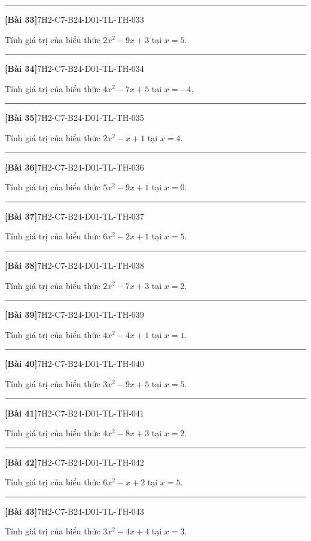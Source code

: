\documentclass[12pt,a4paper]{article}
\newif\ifloigiai
\newenvironment{cauhoi}[2]{%
  \par\medskip\noindent\rule{\textwidth}{0.4pt}\par\nopagebreak
  \noindent\textbf{[#1]}\hfill{\scriptsize\ttfamily #2}\par\nopagebreak\smallskip}{\par}
\newcommand{\loigiai}[1]{\ifloigiai\par\smallskip\noindent\textit{Lời giải.} #1\par\fi}
\begin{document}
\begin{cauhoi}{Bài 33}{7H2-C7-B24-D01-TL-TH-033}
Tính giá trị của biểu thức $2x^{2}-9x+3$ tại $x=5$.
\loigiai{Thay $x=5$: $2\cdot(5)^{2}-9\cdot(5)+3=8$.}
\end{cauhoi}
\begin{cauhoi}{Bài 34}{7H2-C7-B24-D01-TL-TH-034}
Tính giá trị của biểu thức $4x^{2}-7x+5$ tại $x=-4$.
\loigiai{Thay $x=-4$: $4\cdot(-4)^{2}-7\cdot(-4)+5=97$.}
\end{cauhoi}
\begin{cauhoi}{Bài 35}{7H2-C7-B24-D01-TL-TH-035}
Tính giá trị của biểu thức $2x^{2}-x+1$ tại $x=4$.
\loigiai{Thay $x=4$: $2\cdot(4)^{2}-1\cdot(4)+1=29$.}
\end{cauhoi}
\begin{cauhoi}{Bài 36}{7H2-C7-B24-D01-TL-TH-036}
Tính giá trị của biểu thức $5x^{2}-9x+1$ tại $x=0$.
\loigiai{Thay $x=0$: $5\cdot(0)^{2}-9\cdot(0)+1=1$.}
\end{cauhoi}
\begin{cauhoi}{Bài 37}{7H2-C7-B24-D01-TL-TH-037}
Tính giá trị của biểu thức $6x^{2}-2x+1$ tại $x=5$.
\loigiai{Thay $x=5$: $6\cdot(5)^{2}-2\cdot(5)+1=141$.}
\end{cauhoi}
\begin{cauhoi}{Bài 38}{7H2-C7-B24-D01-TL-TH-038}
Tính giá trị của biểu thức $2x^{2}-7x+3$ tại $x=2$.
\loigiai{Thay $x=2$: $2\cdot(2)^{2}-7\cdot(2)+3=-3$.}
\end{cauhoi}
\begin{cauhoi}{Bài 39}{7H2-C7-B24-D01-TL-TH-039}
Tính giá trị của biểu thức $4x^{2}-4x+1$ tại $x=1$.
\loigiai{Thay $x=1$: $4\cdot(1)^{2}-4\cdot(1)+1=1$.}
\end{cauhoi}
\begin{cauhoi}{Bài 40}{7H2-C7-B24-D01-TL-TH-040}
Tính giá trị của biểu thức $3x^{2}-9x+5$ tại $x=5$.
\loigiai{Thay $x=5$: $3\cdot(5)^{2}-9\cdot(5)+5=35$.}
\end{cauhoi}
\begin{cauhoi}{Bài 41}{7H2-C7-B24-D01-TL-TH-041}
Tính giá trị của biểu thức $4x^{2}-8x+3$ tại $x=2$.
\loigiai{Thay $x=2$: $4\cdot(2)^{2}-8\cdot(2)+3=3$.}
\end{cauhoi}
\begin{cauhoi}{Bài 42}{7H2-C7-B24-D01-TL-TH-042}
Tính giá trị của biểu thức $6x^{2}-x+2$ tại $x=5$.
\loigiai{Thay $x=5$: $6\cdot(5)^{2}-1\cdot(5)+2=147$.}
\end{cauhoi}
\begin{cauhoi}{Bài 43}{7H2-C7-B24-D01-TL-TH-043}
Tính giá trị của biểu thức $3x^{2}-4x+4$ tại $x=3$.
\loigiai{Thay $x=3$: $3\cdot(3)^{2}-4\cdot(3)+4=19$.}
\end{cauhoi}
\end{document}
